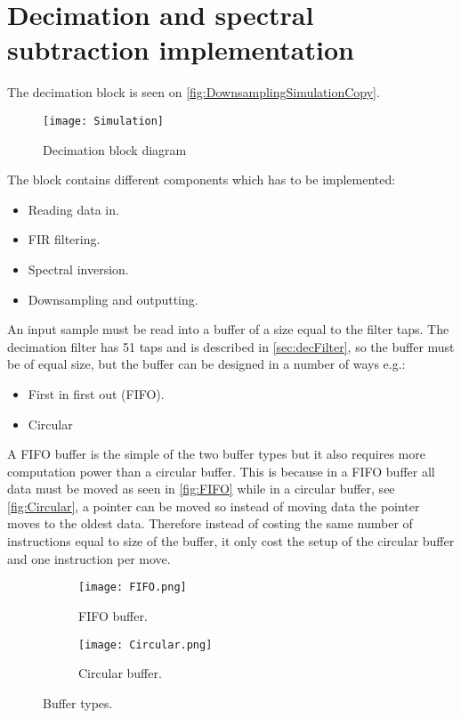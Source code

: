 \section{Decimation and spectral subtraction implementation}
The decimation block is seen on \autoref{fig:DownsamplingSimulationCopy}.
\begin{figure}[H]
    \centering
	\texttt{[image: Simulation]}
    \caption{Decimation block diagram}
    \label{fig:DownsamplingSimulationCopy}
\end{figure}
The block contains different components which has to be implemented:
\begin{itemize}
\item Reading data in.
\item FIR filtering.
\item Spectral inversion.
\item Downsampling and outputting. 
\end{itemize}
An input sample must be read into a buffer of a size equal to the filter taps. The decimation filter has 51 taps and is described in \autoref{sec:decFilter}, so the buffer must be of equal size, but the buffer can be designed in a number of ways e.g.:
\begin{itemize}
\item First in first out (FIFO).
\item Circular
\end{itemize} 
A FIFO buffer is the simple of the two buffer types but it also requires more computation power than a circular buffer. This is because in a FIFO buffer all data must be moved as seen in \autoref{fig:FIFO} while in a circular buffer, see \autoref{fig:Circular}, a pointer can be moved so instead of moving data the pointer moves to the oldest data. Therefore instead of costing the same number of instructions equal to size of the buffer, it only cost the setup of the circular buffer and one instruction per move.   
\begin{figure}[H]
\centering
\begin{subfigure}[t]{0.49\textwidth}
    \centering
	\texttt{[image: FIFO.png]}
	\caption{FIFO buffer.}
	\label{fig:FIFO}
\end{subfigure}
\begin{subfigure}[t]{0.49\textwidth}
    \centering
	\texttt{[image: Circular.png]}
	\caption{Circular buffer.}
	\label{fig:Circular}
\end{subfigure}
\caption{Buffer types.}
\label{fig:bufTypes}
\end{figure}
